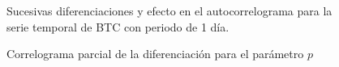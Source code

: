 \documentclass[a4paper,10pt]{article}
\begin{document}
\begin{figure}[h!]
 \centering
  \caption{Sucesivas diferenciaciones y efecto en el autocorrelograma para la serie temporal de BTC con periodo de 1 día.}
  \label{f:btc_1d_diff-fac}
\end{figure}

\begin{figure}[h!]
 \centering
  \caption{Correlograma parcial de la diferenciación para el parámetro $p$}
  \label{f:fac_btc_p}
\end{figure}
\end{document}
